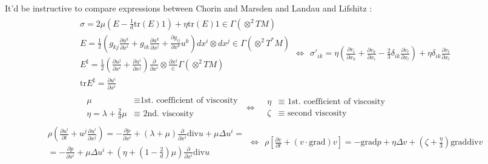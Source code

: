 \documentclass[twoside,landscape,10pt]{amsart}
\theoremstyle{plain}
\theoremstyle{definition}
\theoremstyle{remark}
\theoremstyle{remark}
\begin{document}
\begin{multicols*}{2}
It'd be instructive to compare expressions between Chorin and Marsden \cite{AChorinJMarsden2000} and Landau and Lifshitz \cite{LLandauELifshitz1987}:
\[
\begin{gathered}
  \begin{gathered}
    \sigma = 2 \mu ( E - \frac{1}{d} \text{tr}(E)1 ) + \eta \text{tr}(E) 1 \in \Gamma(\otimes^2TM) \\ 
    E = \frac{1}{2} ( g_{kj} \frac{ \partial u^k}{ \partial x^i} + g_{ik} \frac{ \partial u^k}{ \partial x^j} + \frac{ \partial g_{ij}}{ \partial x^k} u^k ) dx^i \otimes dx^j \in \Gamma(\otimes^2 T^*M) \\ 
    E^{\sharp} = \frac{1}{2} \left( \frac{ \partial u^j}{ \partial x^i} + \frac{ \partial u^i}{ \partial x^j} \right) \frac{ \partial }{ \partial x^i} \otimes \frac{ \partial x^j} \in \Gamma(\otimes^2 TM) \\
\text{tr}E^{\sharp} = \frac{ \partial u^i}{ \partial x^i}
\end{gathered} \Longleftrightarrow \begin{gathered}
    \sigma'_{ik} = \eta \left( \frac{ \partial v_i}{ \partial x_k} + \frac{ \partial v_k}{ \partial x_i} - \frac{2}{3} \delta_{ik} \frac{ \partial v_l}{ \partial x_l } \right) +\eta \delta_{ik} \frac{ \partial v_l}{ \partial x_l}
\end{gathered} \\
\begin{aligned}
&  \mu  & \equiv \text{1st. coefficient of viscosity } \\ 
&  \eta = \lambda + \frac{2}{d} \mu & \equiv \text{ 2nd. viscosity }
\end{aligned} \Longleftrightarrow \begin{aligned}
&  \eta & \equiv \text{ 1st. coefficient of viscosity }\\
& \zeta & \equiv \text{ second viscosity } \end{aligned} 
\end{gathered}
\]
\[
\begin{gathered}
\begin{gathered}
  \rho \left( \frac{ \partial u^i}{ \partial t} + u^j \frac{ \partial u^i }{ \partial x^j} \right) = - \frac{ \partial p}{ \partial x^i } + (\lambda + \mu) \frac{ \partial }{ \partial x^i} \text{div}u + \mu \Delta u^i = \\
  = - \frac{ \partial p}{ \partial x^i} + \mu \Delta u^i + \left( \eta + (1- \frac{2}{d} ) \mu \right) \frac{ \partial }{ \partial x^i} \text{div}u
\end{gathered} \Longleftrightarrow \begin{gathered}
\rho \left[ \frac{ \partial v}{ \partial t} + (v\cdot \text{grad})v \right] = -\text{grad}p + \eta \Delta v + \left(\zeta + \frac{ \eta}{3} \right)\text{grad}\text{div}v 
\end{gathered}
\end{gathered}
\]


\end{multicols*}
\end{document}
